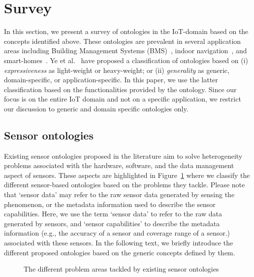 \documentclass{elsart}  %
\begin{document}
\section{Survey}\label{sec:survey}
In this section, we present a survey of ontologies in the IoT-domain based on the concepts identified above. These ontologies are prevalent in several application areas including Building Management Systems (BMS)~\cite{balaji2016brick}, indoor navigation~\cite{szasz2016iloc}, and smart-homes~\cite{Bae201432}. Ye et al.~\cite{ye2007ontology} have proposed a classification of ontologies based on (i) \emph{expressiveness} as light-weight or heavy-weight; or (ii) \emph{generality} as generic, domain-specific, or application-specific. In this paper, we use the latter classification based on the functionalities provided by the ontology. Since our focus is on the entire IoT domain and not on a specific application, we restrict our discussion to generic and domain specific ontologies only.

\subsection{Sensor ontologies}
Existing sensor ontologies proposed in the literature aim to solve heterogeneity problems associated with the hardware, software, and the data management aspect of sensors. These aspects are highlighted in Figure~\ref{fig:sensorOntologies} where we classify the different sensor-based ontologies based on the problems they tackle. Please note that `sensor data' may refer to the raw sensor data generated by sensing the phenomenon, or the metadata information used to describe the sensor capabilities. Here, we use the term `sensor data' to refer to the raw data generated by sensors, and `sensor capabilities' to describe the metadata information (e.g., the accuracy of a sensor and coverage range of a sensor.) associated with these sensors. In the following text, we briefly introduce the different proposed ontologies based on the generic concepts defined by them.%
\begin{figure}[t]
\centering
{}
\caption{The different problem areas tackled by existing sensor ontologies}
\label{fig:sensorOntologies}
\end{figure}
\end{document}
